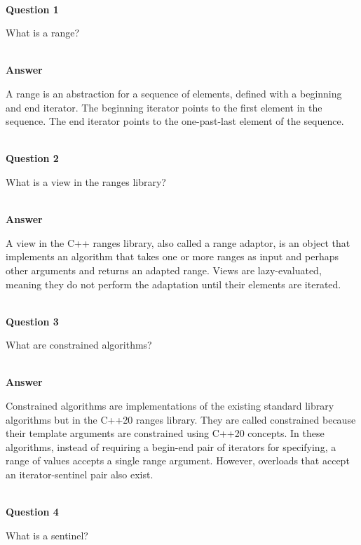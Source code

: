 \hspace*{\fill} \\ %
\noindent
\textbf{Question 1}

What is a range?

\hspace*{\fill} \\ %
\noindent
\textbf{Answer}

A range is an abstraction for a sequence of elements, defined with a beginning and end iterator. The beginning iterator points to the first element in the sequence. The end iterator points to the one-past-last element of the sequence.


\hspace*{\fill} \\ %
\noindent
\textbf{Question 2}

What is a view in the ranges library?

\hspace*{\fill} \\ %
\noindent
\textbf{Answer}

A view in the C++ ranges library, also called a range adaptor, is an object that implements an algorithm that takes one or more ranges as input and perhaps other arguments and returns an adapted range. Views are lazy-evaluated, meaning they do not perform the adaptation until their elements are iterated.

\hspace*{\fill} \\ %
\noindent
\textbf{Question 3}

What are constrained algorithms?

\hspace*{\fill} \\ %
\noindent
\textbf{Answer}

Constrained algorithms are implementations of the existing standard library algorithms but in the C++20 ranges library. They are called constrained because their template arguments are constrained using C++20 concepts. In these algorithms, instead of requiring a begin-end pair of iterators for specifying, a range of values accepts a single range argument. However, overloads that accept an iterator-sentinel pair also exist.

\hspace*{\fill} \\ %
\noindent
\textbf{Question 4}

What is a sentinel?

